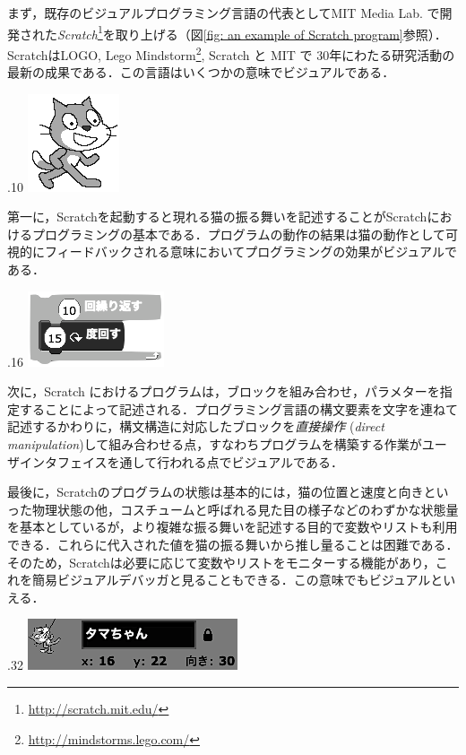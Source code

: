 \documentclass [11pt] {jsarticle}
\begin{document}
まず，既存のビジュアルプログラミング言語の代表としてMIT Media Lab. で開発された\emph {Scratch}\cite {esnick09Scratch:-Programming-for-All}\footnote {\url {http://scratch.mit.edu/}}を取り上げる（図\ref {fig: an example of Scratch program}参照）．ScratchはLOGO\cite {Papert80Mindstorms:-children-computers}, Lego Mindstorm\footnote {\url {http://mindstorms.lego.com/}}, Scratch と MIT で 30年にわたる研究活動の最新の成果である．この言語はいくつかの意味でビジュアルである．

\begin {floatingfigure}[r]{.10\linewidth}
\includegraphics [height=7ex] {figs/scratch-sprite.png}
\end {floatingfigure}
第一に，Scratchを起動すると現れる猫の振る舞いを記述することがScratchにおけるプログラミングの基本である．プログラムの動作の結果は猫の動作として可視的にフィードバックされる意味においてプログラミングの効果がビジュアルである．

\begin {floatingfigure}[r]{.16\linewidth}
\includegraphics [height=7ex] {figs/scratch-block.png}
\end {floatingfigure}
次に，Scratch におけるプログラムは，ブロックを組み合わせ，パラメターを指定することによって記述される．プログラミング言語の構文要素を文字を連ねて記述するかわりに，構文構造に対応したブロックを\emph {直接操作} (\emph {direct manipulation})して組み合わせる点，すなわちプログラムを構築する作業がユーザインタフェイスを通して行われる点でビジュアルである．

最後に，Scratchのプログラムの状態は基本的には，猫の位置と速度と向きといった物理状態の他，コスチュームと呼ばれる見た目の様子などのわずかな状態量を基本としているが，より複雑な振る舞いを記述する目的で変数やリストも利用できる．これらに代入された値を猫の振る舞いから推し量ることは困難である．そのため，Scratchは必要に応じて変数やリストをモニターする機能があり，これを簡易ビジュアルデバッガと見ることもできる．この意味でもビジュアルといえる．
\begin {floatingfigure}[r]{.32\linewidth}
\includegraphics [height=7ex] {figs/scratch-state.png}
\end {floatingfigure}
\end{document}
